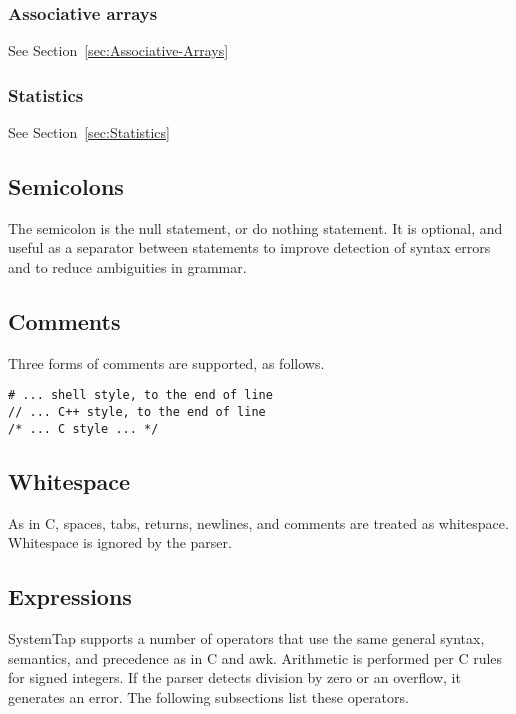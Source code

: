 \documentclass[twoside,english]{article}
\newenvironment{vindent}
{\begin{list}{}{\setlength{\listparindent}{6pt}}
\item[]}
{\end{list}}
\begin{document}
\subsubsection{Associative arrays}

See Section~\ref{sec:Associative-Arrays}


\subsubsection{Statistics}

See Section~\ref{sec:Statistics}


\subsection{Semicolons}
\index{;}
The semicolon is the null statement, or do nothing statement. It is optional,
and useful as a separator between statements to improve detection of syntax
errors and to reduce ambiguities in grammar.


\subsection{Comments}
Three forms of comments are supported, as follows.

\begin{vindent}
\begin{verbatim}
# ... shell style, to the end of line
// ... C++ style, to the end of line
/* ... C style ... */
\end{verbatim}
\end{vindent}

\subsection{Whitespace}
As in C, spaces, tabs, returns, newlines, and comments are treated as whitespace.
Whitespace is ignored by the parser.


\subsection{Expressions}
SystemTap supports a number of operators that use the same general syntax,
semantics, and precedence as in C and awk. Arithmetic is performed per C
rules for signed integers. If the parser detects division by zero or an overflow,
it generates an error. The following subsections list these operators.
\end{document}
